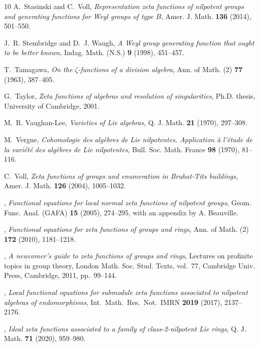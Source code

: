 \documentclass[11pt,a4paper]{amsart}
\theoremstyle{plain}
\theoremstyle{remark}
\begin{document}
\begin{thebibliography}{10}
A.~Stasinski and C.~Voll, \emph{Representation zeta functions of nilpotent
  groups and generating functions for {W}eyl groups of type {$B$}}, Amer. J.
  Math. \textbf{136} (2014), 501--550.

J.~R. Stembridge and D.~J. Waugh, \emph{A {W}eyl group generating function that
  ought to be better known}, Indag. Math. (N.S.) \textbf{9} (1998), 451--457.

T.~Tamagawa, \emph{On the {$\zeta $}-functions of a division algebra}, Ann. of
  Math. (2) \textbf{77} (1963), 387--405.

G.~Taylor, \emph{Zeta functions of algebras and resolution of singularities},
  Ph.D. thesis, University of Cambridge, 2001.

M.~R. Vaughan-Lee, \emph{Varieties of {L}ie algebras}, Q. J. Math. \textbf{21}
  (1970), 297--308.

M.~Vergne, \emph{Cohomologie des alg\`ebres de {L}ie nilpotentes. {A}pplication
  \`a l'\'{e}tude de la vari\'{e}t\'{e} des alg\`ebres de {L}ie nilpotentes},
  Bull. Soc. Math. France \textbf{98} (1970), 81--116.

C.~Voll, \emph{{Zeta functions of groups and enumeration in Bruhat-Tits
  buildings}}, Amer. J. Math. \textbf{126} (2004), 1005--1032.

\bysame, \emph{{Functional equations for local normal zeta functions of
  nilpotent groups}}, Geom. Func. Anal. (GAFA) \textbf{15} (2005), 274--295,
  with an appendix by A. Beauville.

\bysame, \emph{{Functional equations for zeta functions of groups and rings}},
  Ann. of Math. (2) \textbf{172} (2010), 1181--1218.

\bysame, \emph{A newcomer's guide to zeta functions of groups and rings},
  Lectures on profinite topics in group theory, London Math. Soc. Stud. Texts,
  vol.~77, Cambridge Univ. Press, Cambridge, 2011, pp.~99--144.

\bysame, \emph{{Local functional equations for submodule zeta functions
  associated to nilpotent algebras of endomorphisms}}, Int.\ Math.\ Res.\ Not.\
  IMRN \textbf{2019} (2017), 2137--2176.

\bysame, \emph{Ideal zeta functions associated to a family of class-2-nilpotent
  {L}ie rings}, Q. J. Math. \textbf{71} (2020), 959--980.

\end{thebibliography}
\end{document}
